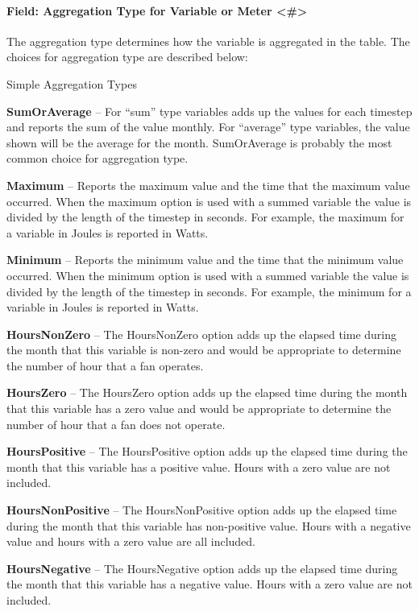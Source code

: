 \paragraph{Field: Aggregation Type for Variable or Meter \textless{}\#\textgreater{}}\label{field-aggregation-type-for-variable-or-meter-000}

The aggregation type determines how the variable is aggregated in the table. The choices for aggregation type are described below:

Simple Aggregation Types

\textbf{SumOrAverage} -- For ``sum'' type variables adds up the values for each timestep and reports the sum of the value monthly. For ``average'' type variables, the value shown will be the average for the month. SumOrAverage is probably the most common choice for aggregation type.

\textbf{Maximum} -- Reports the maximum value and the time that the maximum value occurred. When the maximum option is used with a summed variable the value is divided by the length of the timestep in seconds. For example, the maximum for a variable in Joules is reported in Watts.

\textbf{Minimum} -- Reports the minimum value and the time that the minimum value occurred. When the minimum option is used with a summed variable the value is divided by the length of the timestep in seconds. For example, the minimum for a variable in Joules is reported in Watts.

\textbf{HoursNonZero} -- The HoursNonZero option adds up the elapsed time during the month that this variable is non-zero and would be appropriate to determine the number of hour that a fan operates.

\textbf{HoursZero} -- The HoursZero option adds up the elapsed time during the month that this variable has a zero value and would be appropriate to determine the number of hour that a fan does not operate.

\textbf{HoursPositive} -- The HoursPositive option adds up the elapsed time during the month that this variable has a positive value. Hours with a zero value are not included.

\textbf{HoursNonPositive} -- The HoursNonPositive option adds up the elapsed time during the month that this variable has non-positive value. Hours with a negative value and hours with a zero value are all included.

\textbf{HoursNegative} -- The HoursNegative option adds up the elapsed time during the month that this variable has a negative value. Hours with a zero value are not included.

